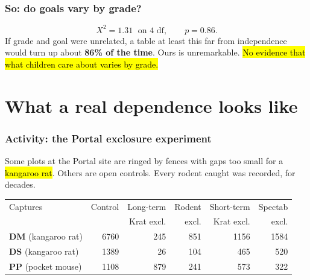 \documentclass[slidestop,compress,mathserif]{beamer}
\begin{document}
\begin{frame}
\frametitle{So: do goals vary by grade?}

\vspace{-0.2em}
\[
X^2 = 1.31 \;\text{ on } 4 \text{ df}, \qquad p = 0.86 .
\]
\vspace{-0.3em}
{\small If grade and goal were unrelated, a table at least this far from independence would turn up about \textbf{86\% of the time}. Ours is unremarkable. \hl{No evidence that what children care about varies by grade.}}

\vspace{0.2em}

\end{frame}

\section{What a real dependence looks like}
\begin{frame}
\frametitle{Activity: the Portal exclosure experiment}

Some plots at the Portal site are ringed by fences with gaps too small for a \hl{kangaroo rat}. Others are open controls. Every rodent caught was recorded, for decades.

\vspace{0.1em}
{\scriptsize
\begin{center}
\begin{tabular}{lrrrrr}
\toprule
Captures & Control & Long-term & Rodent & Short-term & Spectab \\
& & Krat excl. & excl. & Krat excl. & excl. \\
\midrule
\textbf{DM} (kangaroo rat) & 6760 & 245 & 851 & 1156 & 1584 \\
\textbf{DS} (kangaroo rat) & 1389 & 26 & 104 & 465 & 520 \\
\textbf{PP} (pocket mouse) & 1108 & 879 & 241 & 573 & 322 \\
\bottomrule
\end{tabular}
\end{center}}

\vspace{-0.1em}

\end{frame}
\end{document}
